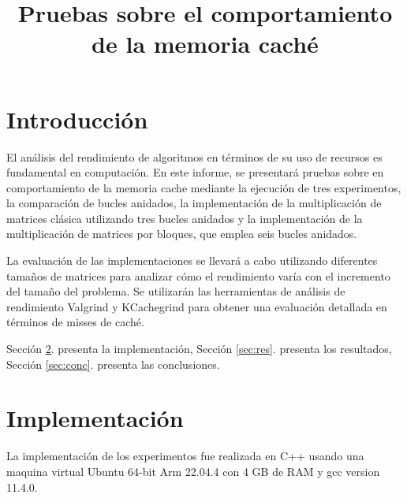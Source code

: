 \documentclass[conference]{IEEEtran}
\begin{document}
\title{Pruebas sobre el comportamiento de la memoria caché}


\author{
}

\maketitle

\begin{abstract}
\end{abstract}

\begin{IEEEkeywords}
\end{IEEEkeywords}

\section{Introducción}\label{sec:intro}
El análisis del rendimiento de algoritmos en términos de su uso de recursos es fundamental en computación. En este informe, se presentará pruebas sobre en comportamiento de la memoria cache mediante la ejecución de tres experimentos, la comparación de bucles anidados, la implementación de la multiplicación de matrices clásica utilizando tres bucles anidados y la implementación de la multiplicación de matrices por bloques, que emplea seis bucles anidados.

La evaluación de las implementaciones se llevará a cabo utilizando diferentes tamaños de matrices para analizar cómo el rendimiento varía con el incremento del tamaño del problema. Se utilizarán las herramientas de análisis de rendimiento Valgrind y KCachegrind para obtener una evaluación detallada en términos de misses de caché.

Sección \ref{sec:meto}. presenta la implementación, 
Sección \ref{sec:res}. presenta los resultados, 
Sección \ref{sec:conc}. presenta las conclusiones. 

\section{Implementación}\label{sec:meto}
La implementación de los experimentos fue realizada en C++ usando una maquina virtual Ubuntu 64-bit Arm 22.04.4 con 4 GB de RAM y gcc version 11.4.0.
\end{document}
